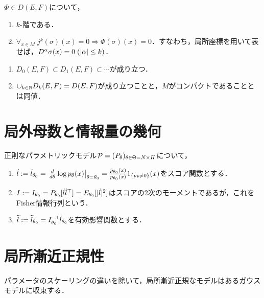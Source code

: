 \documentclass[uplatex,dvipdfmx]{jsreport}
\begin{document}
\begin{corollary}
    $\Phi\in D(E,F)$について，
    \begin{enumerate}
        \item $k$-階である．
        \item $\forall_{x\in M}\;j^k(\sigma)(x)=0\Rightarrow\Phi(\sigma)(x)=0$．すなわち，局所座標を用いて表せば，$D^\al\sigma(x)=0\;(\abs{\al}\le k)$．
    \end{enumerate}
\end{corollary}

\begin{theorem}\mbox{}
    \begin{enumerate}
        \item $D_0(E,F)\subset D_1(E,F)\subset\cdots$が成り立つ．
        \item $\cup_{k\in\N}D_k(E,F)=D(E,F)$が成り立つことと，$M$がコンパクトであることとは同値．
    \end{enumerate}
\end{theorem}

\section{局外母数と情報量の幾何}

\begin{notation}
    正則なパラメトリックモデル$\P=(P_\theta)_{\theta\in\Theta= N\times H}$について，
    \begin{enumerate}
        \item $\dl:=\dl_{\theta_0}=\left.\dd{}{\theta}\log p_\theta(x)\right|_{\theta=\theta_0}=\frac{\dotp_{\theta_0}(x)}{p_{\theta_0}(x)}1_{\Brace{p_\theta\ne0}}(x)$をスコア関数とする．
        \item $I:=I_{\theta_0}=P_{\theta_0}[\dl\dl^\top]=E_{\theta_0}[\abs{\dl}^2]$はスコアの2次のモーメントであるが，これをFisher情報行列という．
        \item $\wl:=\wl_{\theta_0}=I_{\theta_0}^{-1}\dl_{\theta_0}$を有効影響関数とする．
    \end{enumerate}
\end{notation}

\section{局所漸近正規性}

\begin{tcolorbox}[colframe=ForestGreen, colback=ForestGreen!10!white,breakable,colbacktitle=ForestGreen!40!white,coltitle=black,fonttitle=\bfseries\sffamily,
title=]
パラメータのスケーリングの違いを除いて，局所漸近正規なモデルはあるガウスモデルに収束する．
\end{tcolorbox}
\end{document}
